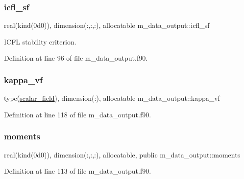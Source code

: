 \subsubsection{\texorpdfstring{icfl\+\_\+sf}{icfl\_sf}}
{\footnotesize\ttfamily real(kind(0d0)), dimension(\+:,\+:,\+:), allocatable m\+\_\+data\+\_\+output\+::icfl\+\_\+sf}



I\+C\+FL stability criterion. 



Definition at line 96 of file m\+\_\+data\+\_\+output.\+f90.

\mbox{\label{namespacem__data__output_a1b71fe1b222b55aa5315838816902b33}} 
\subsubsection{\texorpdfstring{kappa\+\_\+vf}{kappa\_vf}}
{\footnotesize\ttfamily type(\hyperlink{structm__derived__types_1_1scalar__field}{scalar\+\_\+field}), dimension(\+:), allocatable m\+\_\+data\+\_\+output\+::kappa\+\_\+vf}



Definition at line 118 of file m\+\_\+data\+\_\+output.\+f90.

\mbox{\label{namespacem__data__output_abd8505e33c0dce0f0aba7e27ae53bef5}} 
\subsubsection{\texorpdfstring{moments}{moments}}
{\footnotesize\ttfamily real(kind(0d0)), dimension(\+:,\+:,\+:), allocatable, public m\+\_\+data\+\_\+output\+::moments}



Definition at line 113 of file m\+\_\+data\+\_\+output.\+f90.

\mbox{\label{namespacem__data__output_ae17a432fc2e0bc9f3a0c0614ea1cd6f8}} 
